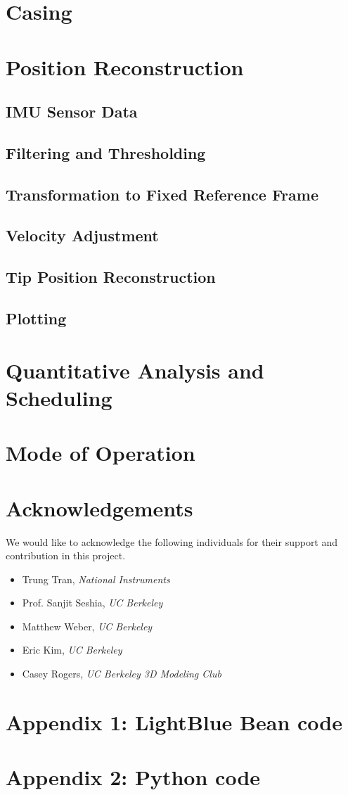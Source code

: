\documentclass[12pt,journal]{IEEEtran}
\begin{document}
\section{Casing}

\section{Position Reconstruction}
\subsection{IMU Sensor Data}
\subsection{Filtering and Thresholding}
\subsection{Transformation to Fixed Reference Frame}
\subsection{Velocity Adjustment}
\subsection{Tip Position Reconstruction}
\subsection{Plotting}

\section{Quantitative Analysis and Scheduling}

\section{Mode of Operation}

\section{Acknowledgements}
We would like to acknowledge the following individuals for their support and contribution in this project.
\begin{itemize}
\item Trung Tran, \textit{National Instruments}
\item Prof. Sanjit Seshia, \textit{UC Berkeley}
\item Matthew Weber, \textit{UC Berkeley}
\item Eric Kim, \textit{UC Berkeley}
\item Casey Rogers, \textit{UC Berkeley 3D Modeling Club}
\end{itemize}

\newpage
\onecolumn

\section{Appendix 1: LightBlue Bean code}
\small{

}

\section{Appendix 2: Python code}
\small{

}
\end{document}
